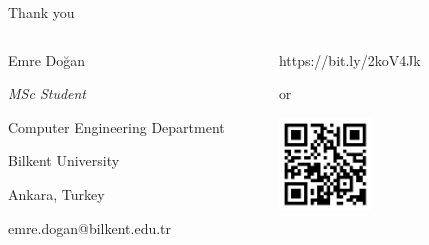 \documentclass{beamer}
\begin{document}
\begin{frame}{Thank you}

\begin{columns}
\begin{column}{0.5\textwidth}
\centering \normalsize Emre Doğan

\centering \small \textit{MSc Student}

\centering \small Computer Engineering Department

\centering \small Bilkent University 

\centering \small Ankara, Turkey

emre.dogan@bilkent.edu.tr
\end{column}
\begin{column}{0.5\textwidth}  %
\centering \Large https://bit.ly/2koV4Jk

\vskip 0.12in

\centering \Large or

\vskip 0.12in

\includegraphics[width=0.4\textwidth]{img/qr_code_researchgate.png}
\end{column}
\end{columns}
\end{frame}

%    
%     
\end{document}
